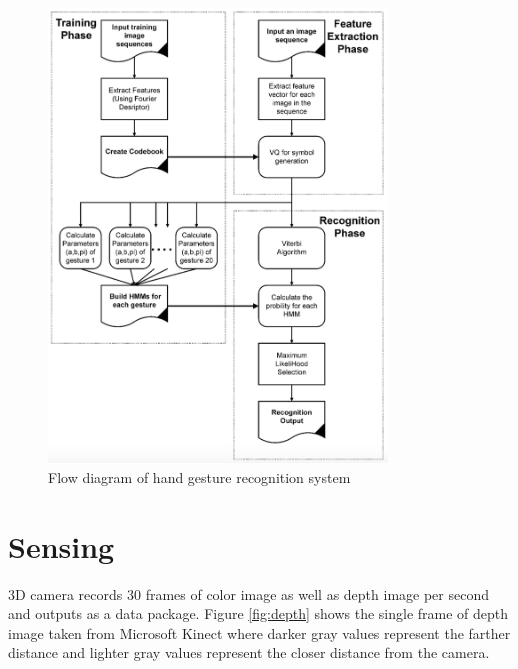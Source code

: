 \begin{figure}
	[!h] \centering 
	\includegraphics[width=9cm]{figures/flow.png} \caption{Flow diagram of hand gesture recognition system} \label{fig:flow} 
\end{figure}

\section{Sensing} 
3D camera records 30 frames of color image as well as depth image per second and outputs as a data package. Figure \ref{fig:depth} shows the single frame of depth image taken from Microsoft Kinect where darker gray values represent the farther distance and lighter gray values represent the closer distance from the camera.

